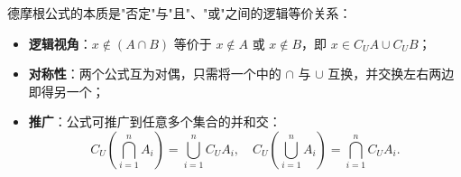 \begin{explanationbox}
德摩根公式的本质是"否定"与"且"、"或"之间的逻辑等价关系：
\begin{itemize}
    \item \textbf{逻辑视角}：$x \notin (A \cap B)$ 等价于 $x \notin A$ 或 $x \notin B$，即 $x \in C_U A \cup C_U B$；
    \item \textbf{对称性}：两个公式互为对偶，只需将一个中的 $\cap$ 与 $\cup$ 互换，并交换左右两边即得另一个；
    \item \textbf{推广}：公式可推广到任意多个集合的并和交：
    \[
    C_U\left(\bigcap_{i=1}^n A_i\right) = \bigcup_{i=1}^n C_U A_i,\quad
    C_U\left(\bigcup_{i=1}^n A_i\right) = \bigcap_{i=1}^n C_U A_i.
    \]
\end{itemize}
\end{explanationbox}